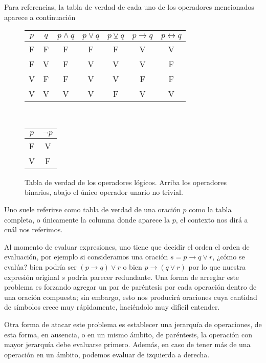 \documentclass{book}
\begin{document}
Para referencias, la tabla de verdad de cada uno de los operadores mencionados aparece a continuación
\begin{figure}[h]
\label{tb_tablaVerdadOperadores}
\begin{center}\begin{tabular}{|c|c||c|c|c|c|c|}
	\hline 
	$p$& $q$ & $p \wedge q $ & $p \vee q$  & $p \veebar q $ & $p \rightarrow q$ & $p \leftrightarrow q$  \\
	\hline \hline
	F & F & F & F & F & V & V \\
	\hline
	F & V & F & V & V & V & F \\
	\hline
	V & F & F & V & V & F & F \\
	\hline
	V & V & V & V & F & V & V \\
	\hline
\end{tabular}\\
\begin{tabular}{|c||c|}
	\hline
	$p$ & $\neg p$ \\
	\hline \hline
	F & V \\
	\hline
	V & F \\
	\hline
\end{tabular}
\end{center}
\caption{Tabla de verdad de los operadores lógicos. Arriba los operadores binarios, abajo el único operador unario no trivial.}
\end{figure}

Uno suele referirse como tabla de verdad de una oración $p$ como la tabla completa, o únicamente la columna donde aparece la $p$, el contexto nos dirá a cuál nos referimos.

Al momento de evaluar expresiones, uno tiene que decidir el orden el orden de evaluación, por ejemplo si consideramos una oración $s=p\rightarrow q \vee r$, ¿cómo se evalúa? bien podría ser $(p\rightarrow q) \vee r$ o bien $p\rightarrow (q \vee r)$ por lo que nuestra expresión original $s$ podría parecer redundante. Una forma de arreglar este problema es forzando agregar un par de paréntesis por cada operación dentro de una oración compuesta; sin embargo, esto nos producirá oraciones cuya cantidad de símbolos crece muy rápidamente, haciéndolo muy difícil entender.

Otra forma de atacar este problema es establecer una jerarquía de operaciones, de esta forma, en ausencia, o en un mismo ámbito, de paréntesis, la operación con mayor jerarquía debe evaluarse primero.
Además, en caso de tener más de una operación en un ámbito, podemos evaluar de izquierda a derecha.
\end{document}
